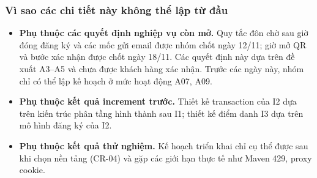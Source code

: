 \subsubsection{Vì sao các chi tiết này không thể lập từ đầu}

\begin{itemize}
    \item \textbf{Phụ thuộc các quyết định nghiệp vụ còn mở.} Quy tắc đôn chờ sau giờ đóng đăng ký và các mốc gửi email được nhóm chốt ngày 12/11; giờ mở QR và bước xác nhận được chốt ngày 18/11. Các quyết định này dựa trên đề xuất A3--A5 và chưa được khách hàng xác nhận. Trước các ngày này, nhóm chỉ có thể lập kế hoạch ở mức hoạt động A07, A09.
    \item \textbf{Phụ thuộc kết quả increment trước.} Thiết kế transaction của I2 dựa trên kiến trúc phân tầng hình thành sau I1; thiết kế điểm danh I3 dựa trên mô hình đăng ký của I2.
    \item \textbf{Phụ thuộc kết quả thử nghiệm.} Kế hoạch triển khai chỉ cụ thể được sau khi chọn nền tảng (CR-04) và gặp các giới hạn thực tế như Maven 429, proxy cookie.
\end{itemize}

